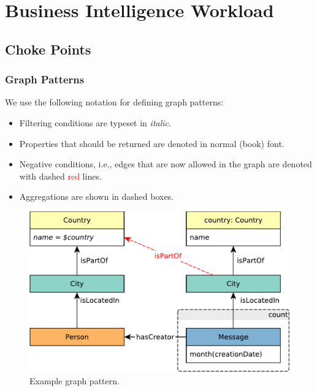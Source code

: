 \chapter{Business Intelligence Workload}

\section{Choke Points}


\subsection{Graph Patterns}

We use the following notation for defining graph patterns:

\begin{itemize}
	\item Filtering conditions are typeset in \textit{italic}.
	\item Properties that should be returned are denoted in normal (book) font.
	\item Negative conditions, i.e., edges that are now allowed in the graph are denoted with dashed \textcolor{red}{red} lines.
	\item Aggregations are shown in dashed boxes.
\end{itemize}

\begin{figure}[hbp]
	\begin{center}
		\includegraphics[scale=\patternscale,margin=0cm .2cm]{patterns/q23}
		\caption{Example graph pattern.}
		\label{fig:example-graph-pattern}
	\end{center}
\end{figure}



